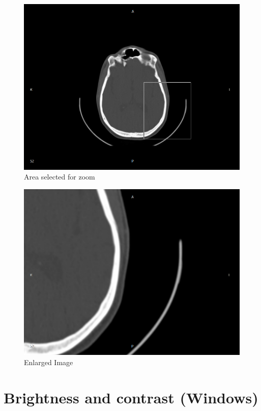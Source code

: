 \begin{figure}[!htb]
\centering
\includegraphics[scale=0.25]{../user_guide_figures/invesalius_screen/tool_zoom_select_image_en.png}
\caption{Area selected for zoom}
\label{fig:zoom_select}
\end{figure}

\begin{figure}[!htb]
\centering
\includegraphics[scale=0.25]{../user_guide_figures/invesalius_screen/tool_image_with_zoom_en.png}
\caption{Enlarged Image}
\label{fig:zoom_applied}
\end{figure}


\section{Brightness and contrast (Windows)}
\label{sec:ww_wl}

